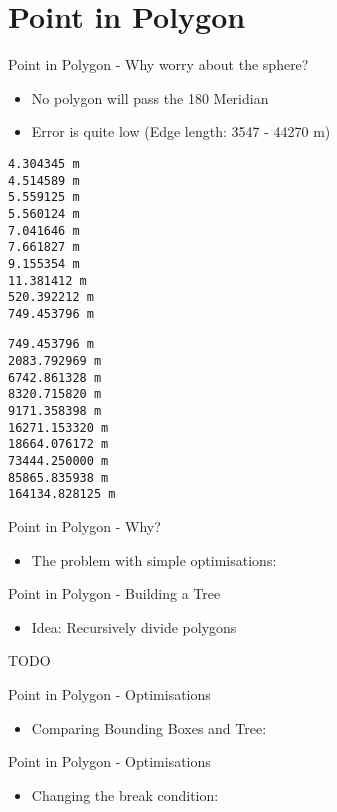 \section{Point in Polygon}
\begin{frame}[fragile]{Point in Polygon - Why worry about the sphere?}
    \begin{itemize}
        \item No polygon will pass the 180 Meridian \cite{OSM:No180Meridian}
        \item Error is quite low (Edge length: 3547 - 44270 m)
    \end{itemize}
    \begin{minipage}{.45\textwidth}
        \begin{lstlisting}
4.304345 m
4.514589 m
5.559125 m
5.560124 m
7.041646 m
7.661827 m
9.155354 m
11.381412 m
520.392212 m
749.453796 m
        \end{lstlisting}
    \end{minipage}
    \begin{minipage}{.45\textwidth}
        \begin{lstlisting}
749.453796 m
2083.792969 m
6742.861328 m
8320.715820 m
9171.358398 m
16271.153320 m
18664.076172 m
73444.250000 m
85865.835938 m
164134.828125 m
        \end{lstlisting}
    \end{minipage}
\end{frame}

\begin{frame}{Point in Polygon - Why?}
    \begin{itemize}
        \item The problem with simple optimisations:
    \end{itemize}
\end{frame}

\begin{frame}{Point in Polygon - Building a Tree}
    \begin{itemize}
        \item Idea: Recursively divide polygons
    \end{itemize}
    TODO
\end{frame}

\begin{frame}{Point in Polygon - Optimisations}
    \begin{itemize}
        \item Comparing Bounding Boxes and Tree:
    \end{itemize}
\end{frame}

\begin{frame}{Point in Polygon - Optimisations}
    \begin{itemize}
        \item Changing the break condition:
    \end{itemize}
\end{frame}
